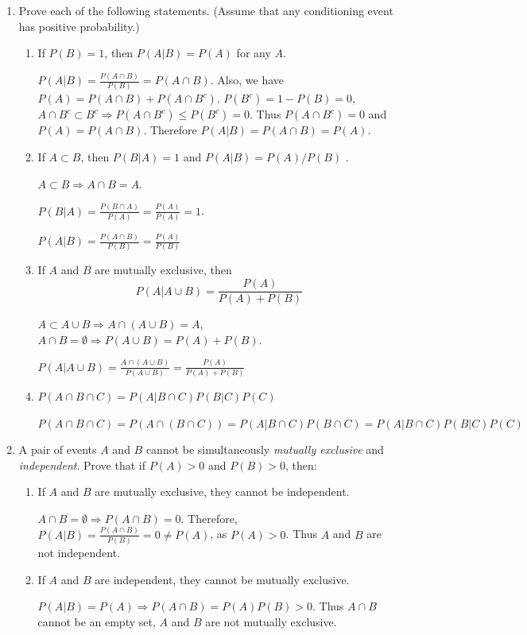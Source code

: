 \documentclass[letter]{article}
\begin{document}
\begin{enumerate}[leftmargin = 0 em, label = \arabic*., font = \bfseries]
	\item Prove each of the following statements. (Assume that any conditioning event has positive probability.)
	\begin{enumerate}[leftmargin = 0em]
		\item If $P(B) = 1$, then $P(A|B) = P(A)$ for any $A$.

		$P(A|B) = \frac{P(A \cap B)}{P(B)} = P(A \cap B) $. Also, we have $P(A) = P(A \cap B) + P(A \cap B^c)$. $P(B^c) = 1 - P(B) = 0$, $A\cap B^c \subset B^c \Rightarrow P(A\cap B^c) \leq P(B^c) = 0$. Thus $P(A \cap B^c) = 0$ and $P(A) = P(A \cap B)$. Therefore $P(A|B) = P(A\cap B) = P(A)$.
		\item If $A \subset B$, then $P(B|A) = 1$ and $P(A|B) = P(A)/P(B)$ .

		$A \subset B \Rightarrow A\cap B = A$.

		$P(B|A) = \frac{P(B\cap A)}{P(A)} = \frac{P(A)}{P(A)} =1$.

		$P(A|B) = \frac{P(A\cap B)}{P(B)} = \frac{P(A)}{P(B)}$
		\item If $A$ and $B$ are mutually exclusive, then
		\[P(A| A\cup B) = \frac{P(A)}{P(A)+P(B)}\]

		$A\subset A\cup B \Rightarrow A\cap (A\cup B) = A$, $A\cap B = \emptyset \Rightarrow P(A\cup B) = P(A) +P(B)$.

		$P(A|A\cup B) = \frac{A\cap (A\cup B)}{P(A\cup B)} = \frac{P(A)}{P(A)+P(B)}$

		\item $P(A\cap B\cap C) = P(A|B\cap C)P(B|C)P(C)$

		$P(A\cap B\cap C) = P(A\cap (B\cap C)) = P(A|B\cap C)P(B\cap C) = P(A|B\cap C)P(B|C)P(C)$
	\end{enumerate}
	
	\item A pair of events $A$ and $B$ cannot be simultaneously \emph{mutually exclusive} and \emph{independent}. Prove that if $P(A) > 0$ and $P(B) > 0$, then:
	\begin{enumerate}[leftmargin = 0em]
		\item If $A$ and $B$ are mutually exclusive, they cannot be independent.

		$A\cap B = \emptyset \Rightarrow P(A\cap B) = 0$. Therefore, $P(A|B) = \frac{P(A\cap B)}{P(B)} = 0 \neq P(A)$, as $P(A) >0$. Thus $A$ and $B$ are not independent.
		\item If $A$ and $B$ are independent, they cannot be mutually exclusive.

		$P(A|B) = P(A) \Rightarrow P(A\cap B) = P(A)P(B) >0$. Thus $A\cap B$ cannot be an empty set, $A$ and $B$ are not mutually exclusive.
	\end{enumerate}
	

\end{enumerate}
\end{document}
